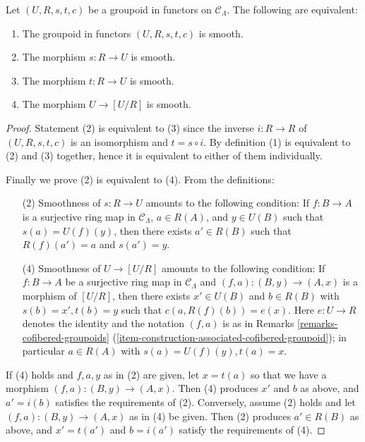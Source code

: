 \begin{lemma}
\label{lemma-smooth-quotient-morphism}
Let $(U, R, s,t,c)$ be a groupoid in functors on $\mathcal{C}_\Lambda$.  The 
following are equivalent: 
\begin{enumerate}
\item The groupoid in functors $(U, R, s,t,c)$ is smooth.
\item The morphism $s: R \to U$ is smooth.
\item The morphism $t: R \to U$ is smooth.
\item The morphism $U \to [U/R]$ is smooth.
\end{enumerate}
\end{lemma}

\begin{proof}
Statement (2) is equivalent to (3) since the inverse $i: R \to R$ of 
$(U, R, s,t,c)$ is an isomorphism and $t = s \circ i$. By definition (1) is 
equivalent to (2) and (3) together, hence it is equivalent to either of them 
individually. 

\medskip \noindent
Finally we prove (2) is equivalent to (4). From the definitions:
\begin{enumerate}
\item[(2)] Smoothness of $s: R \to U$ amounts to the following 
condition: If $f: B \to A$ is a surjective ring map in $\mathcal 
C_\Lambda$, $a \in R(A)$, and $y \in U(B)$ such that $s(a) = U(f)(y)$, then 
there exists $a' \in R(B)$ such that $R(f)(a') = a$ and $s(a') = y$.

\item[(4)] Smoothness of $U \to [U/R]$ amounts to the following 
condition: If $f: B \to A$ be a surjective ring map in $\mathcal 
C_\Lambda$ and $(f,a): (B,y) \to (A,x)$ is a morphism of $[U/R]$, 
then there exists $x' \in U(B)$ and $b \in R(B)$ with $s(b) = x', t(b) = y$ 
such that $c(a,R(f)(b)) = e(x)$.  Here $e: U \to R$ denotes the 
identity and the notation $(f,a)$ is as in Remarks 
\ref{remarks-cofibered-groupoids} 
(\ref{item-construction-associated-cofibered-groupoid});
in particular $a \in R(A)$ with $s(a) = U(f)(y), t(a) = x$.  
\end{enumerate}
If (4) holds and $f,a,y$ as in (2) are given, let $x = t(a)$ so that we have a 
morphism $(f,a): (B,y) \to (A,x)$.  Then (4) produces $x'$ and $b$ as 
above, and $a' = i(b)$ satisfies the requirements of (2).  Conversely, assume 
(2) holds and let $(f,a): (B,y) \to (A,x)$ as in (4) be given.  Then 
(2) produces $a' \in R(B)$ as above, and $x' = t(a')$ and $b = i(a')$ satisfy 
the requirements of (4).
\end{proof}

